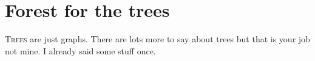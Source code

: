 \chapter{Forest for the trees}
\lettrine[lines=4]{T}{rees} are just graphs. There are lots more to say about trees but that is
your job not mine. I already said some stuff once. 

